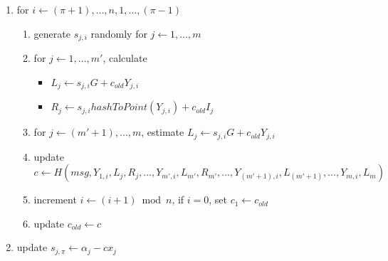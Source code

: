 \begin{description}
\begin{enumerate}
				\item for \(i\leftarrow(\pi+1),\dots,n,1,\dots,(\pi-1)\)
					\begin{enumerate}
						\item generate \(s_{j,i}\) randomly for \(j\leftarrow1,\dots,m\)
						\item for \(j\leftarrow1,\dots,m'\), calculate
							\begin{itemize}
								\item \(L_j\leftarrow s_{j,i} G+c_{old} Y_{j,i}\)
								\item \(R_j \leftarrow s_{j,i} hashToPoint(Y_{j,i}) + c_{old} I_{j}\)
							\end{itemize}
						\item for \(j\leftarrow(m'+1),\dots,m\), estimate \(L_j\leftarrow s_{j,i} G+c_{old} Y_{j,i}\)
						\item update \(c\leftarrow H(msg,Y_{1,i},L_j,R_j,\dots,Y_{m',i},L_{m'},R_{m'},\dots,Y_{(m'+1),i},L_{(m'+1)},\dots,Y_{m,i},L_{m})\)
						\item increment \(i\leftarrow(i+1)\bmod n\), if \(i=0\), set \(c_1\leftarrow c_{old}\)
						\item update \(c_{old}\leftarrow c\)
					\end{enumerate}
				\item update \(s_{j,\pi}\leftarrow\alpha_j-c x_j\)
			\end{enumerate}
	\end{description}
